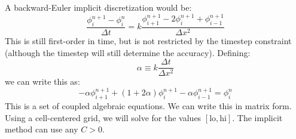 A backward-Euler implicit discretization would be:
\begin{equation}
\frac{\phi_i^{n+1} - \phi_i^n}{\Delta t} = 
  k \frac{\phi_{i+1}^{n+1} - 2\phi_i^{n+1} + \phi_{i-1}^{n+1}}{\Delta x^2}
\end{equation}
This is still first-order in time, but is not restricted by the timestep
constraint (although the timestep will still determine the accuracy).  
Defining:
\begin{equation}
\alpha \equiv k \frac{\Delta t}{\Delta x^2}
\end{equation}
we can write this as:
\begin{equation}
\label{eq:diff:implicit}
-\alpha \phi_{i+1}^{n+1} + (1 + 2\alpha) \phi_{i}^{n+1} - \alpha \phi_{i-1}^{n+1} = \phi_i^n
\end{equation}
This is a set of coupled algebraic equations.  We can write this in
matrix form.  Using a cell-centered grid, we will solve for the values
$[\mathrm{lo},\mathrm{hi}]$.  
The implicit method can use any $C > 0$.

